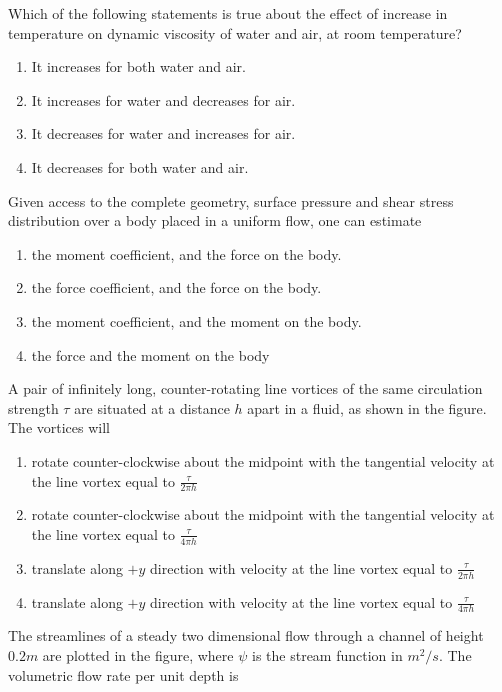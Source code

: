 \iffalse	
	\chapter{2020}
	\author{AI24BTECH11016}
	\section{ae}
\fi


\item
	Which of the following statements is true about the effect of increase in temperature on dynamic viscosity of water and air, at room temperature?
		\begin{enumerate}
			\item It increases for both water and air.
			\item It increases for water and decreases for air.
			\item It decreases for water and increases for air.
			\item It decreases for both water and air.
		\end{enumerate}
	\item 
	Given access to the complete geometry, surface pressure and shear stress distribution over a body placed in a uniform flow, one can estimate
		\begin{enumerate}
			\item the moment coefficient, and the force on the body.
			\item the force coefficient, and the force on the body.
			\item the moment coefficient, and the moment on the body.
			\item the force and the moment on the body
		\end{enumerate}
	\item
	A pair of infinitely long, counter-rotating line vortices of the same circulation strength $\tau$ are situated at a distance $h$ apart in a fluid, as shown in the figure. The vortices will
	
    		
    		
		\begin{enumerate}
			\item rotate counter-clockwise about the midpoint with the tangential velocity at the line vortex equal to $\frac{\tau}{2\pi h}$
			\item rotate counter-clockwise about the midpoint with the tangential velocity at the line vortex equal to $\frac{\tau}{4\pi h}$
			\item translate along $+y$ direction with velocity at the line vortex equal to $\frac{\tau}{2\pi h}$
			\item translate along $+y$ direction with velocity at the line vortex equal to $\frac{\tau}{4\pi h}$
		\end{enumerate}
	\item
	The streamlines of a steady two dimensional flow through a channel of height $0.2 m$ are plotted in the figure, where $\psi$ is the stream function in $m^{2}/s$. The volumetric flow rate per unit depth is
	
